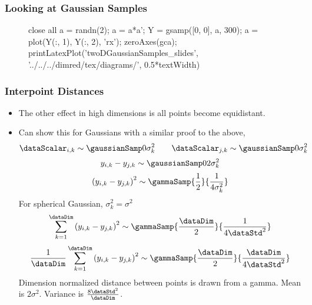 \begin{frame}[fragile]
  \frametitle{Looking at Gaussian Samples}

  \begin{figure}
    \begin{matlab}
    close all
    a = randn(2);
    a = a*a';
    Y = gsamp([0, 0], a, 300);
    a = plot(Y(:, 1), Y(:, 2), 'rx');
    zeroAxes(gca);
    printLatexPlot('twoDGaussianSamples_slides', '../../../dimred/tex/diagrams/', 0.5*textWidth)
    \end{matlab}
    \begin{center}
    \end{center}
  \end{figure}
\end{frame}


\begin{frame}
  \frametitle{Interpoint Distances}

  \begin{itemize}
  \item The other effect in high dimensions is all points become
    equidistant.
  \item Can show this for Gaussians with a similar proof to the
    above,
    \[ 
    \dataScalar_{i,k}\sim\gaussianSamp
    0{\sigma_{k}^{2}}\quad \quad \dataScalar_{j,k}\sim\gaussianSamp
    0{\sigma_{k}^{2}}
    \]
    \[
    y_{i,k}-y_{j,k}\sim\gaussianSamp 0{2\sigma_{k}^{2}}
    \]
    \[
    \left(y_{i,k}-y_{j,k}\right)^{2}\sim\gammaSamp{\frac{1}{2}}{\frac{1}{4\sigma_{k}^{2}}}
    \]
    For spherical Gaussian, $\sigma_{k}^{2}=\sigma^{2}$ 
    \[
    \sum_{k=1}^{\dataDim}\left(y_{i,k}-y_{j,k}\right)^{2}\sim\gammaSamp{\frac{\dataDim}{2}}{\frac{1}{4\dataStd^{2}}}
    \]
    \[
    \frac{1}{\dataDim}\sum_{k=1}^{\dataDim}\left(y_{i,k}-y_{j,k}\right)^{2}\sim\gammaSamp{\frac{\dataDim}{2}}{\frac{\dataDim}{4\dataStd^{2}}}
    \]
    Dimension normalized distance between points is drawn from a gamma.
    Mean is $2\sigma^{2}$. Variance is $\frac{8\dataStd^{2}}{\dataDim}$.
  \end{itemize}

\end{frame}


